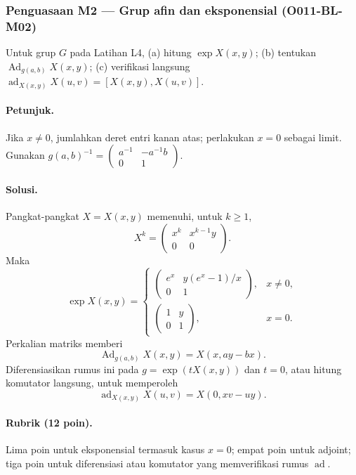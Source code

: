 \subsubsection*{Penguasaan M2 — Grup afin dan eksponensial (O011-BL-M02)}
\label{o011-bl-m02}

Untuk grup $G$ pada Latihan L4, (a) hitung
$\exp X(x,y)$; (b) tentukan $\operatorname{Ad}_{g(a,b)}X(x,y)$; (c) verifikasi
langsung $\operatorname{ad}_{X(x,y)}X(u,v)=[X(x,y),X(u,v)]$.

\paragraph{Petunjuk.}
Jika $x\ne0$, jumlahkan deret entri kanan atas; perlakukan $x=0$ sebagai
limit. Gunakan
$g(a,b)^{-1}=\left(\begin{smallmatrix}a^{-1}&-a^{-1}b\\0&1\end{smallmatrix}\right)$.

\paragraph{Solusi.}
Pangkat-pangkat $X=X(x,y)$ memenuhi, untuk $k\ge1$,
\[
 X^k=\begin{pmatrix}x^k&x^{k-1}y\\0&0\end{pmatrix}.
\]
Maka
\[
 \exp X(x,y)=
 \begin{cases}
 \left(\begin{smallmatrix}e^x&y(e^x-1)/x\\0&1\end{smallmatrix}\right),&x\ne0,\\[2mm]
 \left(\begin{smallmatrix}1&y\\0&1\end{smallmatrix}\right),&x=0.
 \end{cases}
\]
Perkalian matriks memberi
\[
 \operatorname{Ad}_{g(a,b)}X(x,y)=X(x,ay-bx).
\]
Diferensiasikan rumus ini pada $g=\exp(tX(x,y))$ dan $t=0$, atau hitung
komutator langsung, untuk memperoleh
\[
 \operatorname{ad}_{X(x,y)}X(u,v)=X(0,xv-uy).
\]

\paragraph{Rubrik (12 poin).}
Lima poin untuk eksponensial termasuk kasus $x=0$; empat poin untuk adjoint;
tiga poin untuk diferensiasi atau komutator yang memverifikasi rumus
$\operatorname{ad}$.

